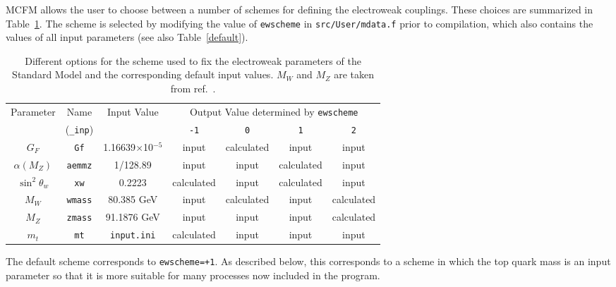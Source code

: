 \label{Input_parameters}

MCFM allows the user to choose between a number of schemes
for defining the electroweak couplings. These choices are summarized
in Table~\ref{ewscheme}. The scheme is selected by modifying the
value of {\tt ewscheme} in {\tt src/User/mdata.f} prior to compilation, 
which also contains
the values of all input parameters (see also Table~\ref{default}).

\begin{table}
\begin{center}
	\caption{Different options for the scheme used to fix the electroweak
		parameters of the Standard Model and the corresponding default input
		values. $M_W$ and $M_Z$ are taken from ref.~\cite{Amsler:2008zzb}.}
	\label{ewscheme}
	\vspace{0.5em}
\begin{tabular}{|c|c|c|c|c|c|c|} \hline
 Parameter & Name & Input Value
 & \multicolumn{4}{c|}{Output Value determined by \tt ewscheme} \\
\cline{4-7}
& ({\tt \_inp}) & & {\tt -1} & {\tt 0} & {\tt 1} & {\tt 2} \\ \hline
$G_F$            & {\tt Gf}      & 1.16639$\times$10$^{-5}$ 
 & input & calculated & input & input \\
$\alpha(M_Z)$    & {\tt aemmz}   & 1/128.89                 
 & input & input & calculated & input \\
$\sin^2 \theta_w$& {\tt xw}      & 0.2223               
 & calculated & input & calculated & input \\
$M_W$            & {\tt wmass}   & 80.385 GeV                
 & input & calculated & input & calculated \\
$M_Z$            & {\tt zmass}   & 91.1876 GeV               
 & input & input & input & calculated \\
$m_t$            & {\tt mt}      & {\tt input.ini}                  
 & calculated & input & input & input \\
\hline
\end{tabular}
\end{center}
\end{table}

The default scheme corresponds to {\tt ewscheme=+1}. As described below, this corresponds to a scheme
in which the top quark mass is an input parameter so that it is
more suitable for many processes now included in the program.


